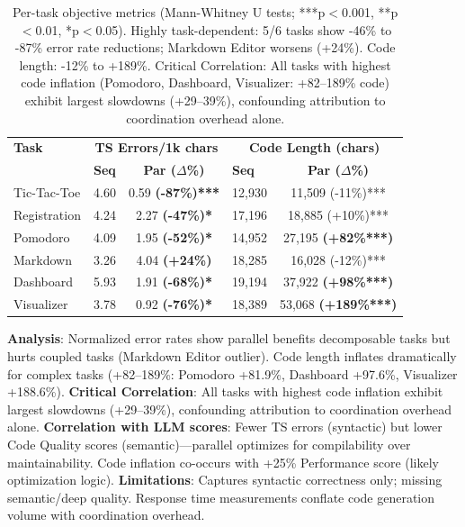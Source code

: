 \documentclass{article}
\begin{document}
\begin{table}[t]
\caption{Per-task objective metrics (Mann-Whitney U tests; ***p$<$0.001, **p$<$0.01, *p$<$0.05). Highly task-dependent: 5/6 tasks show -46\% to -87\% error rate reductions; Markdown Editor worsens (+24\%). Code length: -12\% to +189\%. Critical Correlation: All tasks with highest code inflation (Pomodoro, Dashboard, Visualizer: +82--189\% code) exhibit largest slowdowns (+29--39\%), confounding attribution to coordination overhead alone.}
\label{tab:objective}
\vskip 0.15in
\centering
\small
\begin{tabular}{lcclc}
\toprule
\textbf{Task} & \multicolumn{2}{c}{\textbf{TS Errors/1k chars}} & \multicolumn{2}{c}{\textbf{Code Length (chars)}} \\
& \textbf{Seq} & \textbf{Par ($\Delta$\%)} & \textbf{Seq} & \textbf{Par ($\Delta$\%)} \\
\midrule
Tic-Tac-Toe & 4.60 & 0.59 \textbf{(-87\%)***} & 12,930 & 11,509 (-11\%)*** \\
Registration & 4.24 & 2.27 \textbf{(-47\%)*} & 17,196 & 18,885 (+10\%)*** \\
Pomodoro & 4.09 & 1.95 \textbf{(-52\%)*} & 14,952 & 27,195 \textbf{(+82\%***)} \\
Markdown & 3.26 & 4.04 \textbf{(+24\%)} & 18,285 & 16,028 (-12\%)*** \\
Dashboard & 5.93 & 1.91 \textbf{(-68\%)*} & 19,194 & 37,922 \textbf{(+98\%***)} \\
Visualizer & 3.78 & 0.92 \textbf{(-76\%)*} & 18,389 & 53,068 \textbf{(+189\%***)} \\
\bottomrule
\end{tabular}
\end{table}

\textbf{Analysis}: Normalized error rates show parallel benefits decomposable tasks but hurts coupled tasks (Markdown Editor outlier). Code length inflates dramatically for complex tasks (+82--189\%: Pomodoro +81.9\%, Dashboard +97.6\%, Visualizer +188.6\%). \textbf{Critical Correlation}: All tasks with highest code inflation exhibit largest slowdowns (+29--39\%), confounding attribution to coordination overhead alone. \textbf{Correlation with LLM scores}: Fewer TS errors (syntactic) but lower Code Quality scores (semantic)---parallel optimizes for compilability over maintainability. Code inflation co-occurs with +25\% Performance score (likely optimization logic). \textbf{Limitations}: Captures syntactic correctness only; missing semantic/deep quality. Response time measurements conflate code generation volume with coordination overhead.
\end{document}
